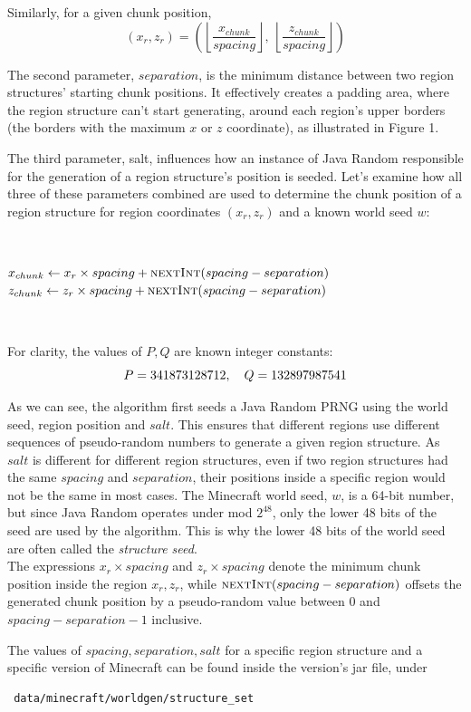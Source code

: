 \documentclass{article}
\begin{document}
\noindent Similarly, for a given chunk position,
\begin{equation}
    (x_r, z_r) = \left( \left\lfloor \frac{x_{chunk}}{spacing} \right\rfloor,\ \left\lfloor \frac{z_{chunk}}{spacing} \right\rfloor \right)
\end{equation}

The second parameter, $separation$, is the minimum distance between two region structures' starting chunk positions. It effectively creates a padding area, where the region structure can't start generating, around each region's upper borders (the borders with the maximum $x$ or $z$ coordinate), as illustrated in Figure 1. %

The third parameter, salt, influences how an instance of Java Random responsible for the generation of a region structure's position is seeded. 
Let's examine how all three of these parameters combined are used to determine the chunk position of a region structure for region coordinates $(x_r, z_r)$ and a known world seed $w$:

\
\begin{algorithmic}
\State {}
\State $x_{chunk} \gets x_r \times spacing + \Call{nextInt}{spacing - separation}$
\State $z_{chunk} \gets z_r \times spacing + \Call{nextInt}{spacing - separation}$
\end{algorithmic}
\ \

\noindent For clarity, the values of $P, Q$ are known integer constants:
\begin{equation}\notag
    P = 341873128712, \quad Q = 132897987541
\end{equation}

As we can see, the algorithm first seeds a Java Random PRNG using the world seed, region position and $salt$. This ensures that different regions use different sequences of pseudo-random numbers to generate a given region structure. As $salt$ is different for different region structures, even if two region structures had the same $spacing$ and $separation$, their positions inside a specific region would not be the same in most cases. The Minecraft world seed, $w$, is a 64-bit number, but since Java Random operates under mod $2^{48}$, only the lower 48 bits of the seed are used by the algorithm. This is why the lower 48 bits of the world seed are often called the \emph{structure seed}. \\
The expressions $x_r \times spacing$ and $z_r \times spacing$ denote the minimum chunk position inside the region $x_r, z_r$, while $\Call{nextInt}{spacing - separation}$ offsets the generated chunk position by a pseudo-random value between 0 and $spacing - separation - 1$ inclusive.

The values of $spacing, separation, salt$ for a specific region structure and a specific version of Minecraft can be found inside the version's jar file, under 
\begin{verbatim} data/minecraft/worldgen/structure_set \end{verbatim}
\end{document}
